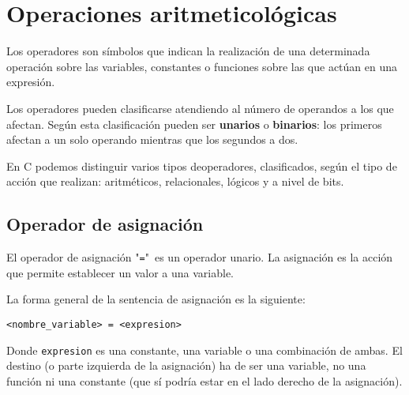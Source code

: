 \section{Operaciones aritmeticológicas}
Los operadores son símbolos que indican la realización de una determinada operación sobre las variables, constantes o funciones sobre las que actúan en una expresión.

Los operadores pueden clasificarse atendiendo al número de operandos a los que afectan. Según esta clasificación pueden ser \textbf{unarios} o \textbf{binarios}: los primeros afectan a un solo operando mientras que los segundos a dos.

En C podemos distinguir varios tipos deoperadores, clasificados, según el tipo de acción que realizan: aritméticos, relacionales, lógicos y a nivel de bits.
\subsection{Operador de asignación}{
El operador de asignación "\texttt{=}"\ es un operador unario. La asignación es la acción que permite establecer un valor a una variable.

La forma general de la sentencia de asignación es la siguiente:

\texttt{<nombre\_variable>\ = <expresion>}

Donde \texttt{expresion} es una constante, una variable o una combinación de ambas. El destino (o parte izquierda de la asignación) ha de ser una variable, no una función ni una constante (que sí podría estar en el lado derecho de la asignación).
}
